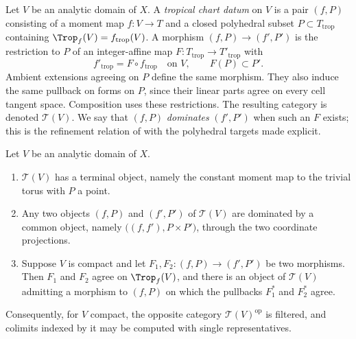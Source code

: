\begin{definition}
\label{def:ch13-chart-category}
Let $V$ be an analytic domain of $X$.  A \emph{tropical chart datum} on $V$
is a pair $(f,P)$ consisting of a moment map $f:V\to T$ and a closed
polyhedral subset $P\subset T_{\mathrm{trop}}$ containing
$\Trop_f(V)=f_{\mathrm{trop}}(V)$.  A morphism
$(f,P)\to(f',P')$ is the restriction to $P$ of an integer-affine map
$F:T_{\mathrm{trop}}\to T'_{\mathrm{trop}}$ with
\[
 f'_{\mathrm{trop}}=F\circ f_{\mathrm{trop}}
 \quad\text{on }V,
 \qquad F(P)\subset P'.
\]
Ambient extensions agreeing on $P$ define the same morphism.  They also
induce the same pullback on forms on $P$, since their linear parts agree
on every cell tangent space.  Composition uses these restrictions.
The resulting category is denoted $\mathscr T(V)$.  We say that $(f,P)$
\emph{dominates} $(f',P')$ when such an $F$ exists; this is the refinement
relation of  with the polyhedral targets
made explicit.
\end{definition}

\begin{lemma}
\label{lem:ch13-charts-filtered}
Let $V$ be an analytic domain of $X$.
\begin{enumerate}
\item\label{itm:ch13-cf:final} $\mathscr T(V)$ has a terminal object, namely
  the constant moment map to the trivial torus with $P$ a point.
\item\label{itm:ch13-cf:prod} Any two objects $(f,P)$ and $(f',P')$ of
  $\mathscr T(V)$ are dominated by a common object, namely
  $\bigl((f,f'),P\times P'\bigr)$, through the two coordinate projections.
\item\label{itm:ch13-cf:equal} Suppose $V$ is compact and let
  $F_1,F_2:(f,P)\to(f',P')$ be two morphisms.  Then $F_1$ and $F_2$ agree on
  $\Trop_f(V)$, and there is an object of $\mathscr T(V)$ admitting a
  morphism to $(f,P)$ on which the pullbacks $F_1^*$ and $F_2^*$ agree.
\end{enumerate}
Consequently, for $V$ compact, the opposite category
$\mathscr T(V)^{\mathrm{op}}$ is filtered, and colimits indexed by it may be
computed with single representatives.
\end{lemma}

